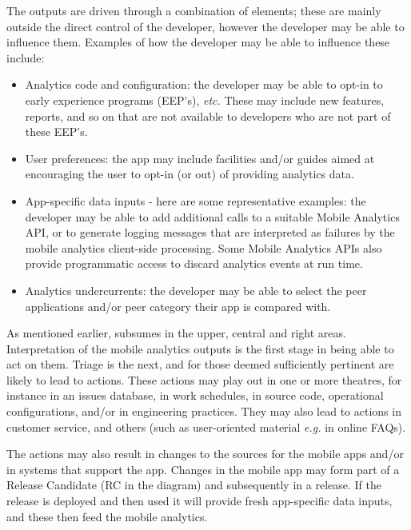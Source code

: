 The outputs are driven through a combination of elements; these are mainly outside the direct control of the developer, however the developer may be able to influence them. Examples of how the developer may be able to influence these include:
\begin{itemize}
    \itemsep0em
    \item Analytics code and configuration: the developer may be able to opt-in to early experience programs (EEP's), \emph{etc.} These may include new features, reports, and so on that are not available to developers who are not part of these EEP's.
    \item User preferences: the app may include facilities and/or guides aimed at encouraging the user to opt-in (or out) of providing analytics data.
    \item App-specific data inputs - here are some representative examples: the developer may be able to add additional calls to a suitable Mobile Analytics API, or to generate logging messages that are interpreted as failures by the mobile analytics client-side processing. Some Mobile Analytics APIs also provide programmatic access to discard analytics events at run time.  
    \item Analytics undercurrents: the developer may be able to select the peer applications and/or peer category their app is compared with.
\end{itemize}

As mentioned earlier,  subsumes  in the upper, central and right areas. Interpretation of the mobile analytics outputs is the first stage in being able to act on them. Triage is the next, and for those deemed sufficiently pertinent are likely to lead to actions. These actions may play out in one or more theatres, for instance in an issues database, in work schedules, in source code, operational configurations, and/or in engineering practices. They may also lead to actions in customer service, and others (such as user-oriented material \emph{e.g.} in online FAQs).

The actions may also result in changes to the sources for the mobile apps and/or in systems that support the app. Changes in the mobile app may form part of a Release Candidate (RC in the diagram) and subsequently in a release. If the release is deployed and then used it will provide fresh app-specific data inputs, and these then feed the mobile analytics.

